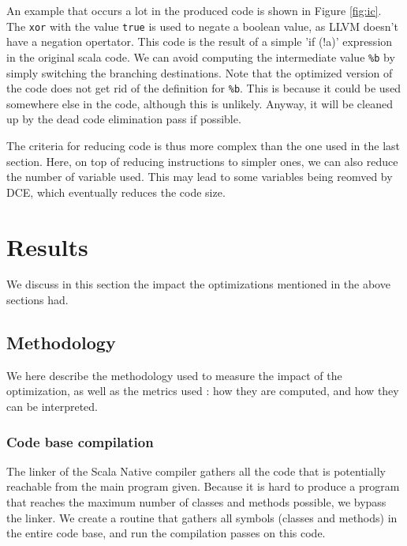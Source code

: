 \documentclass[12pt,a4paper]{article}
\newcommand{\scala}[1]{\textsf{#1}}
\newcommand{\nir}[1]{\texttt{#1}}
\begin{document}
An example that occurs a lot in the produced code is shown in Figure \ref{fig:ic}. The \nir{xor} with the value \nir{true} is used to negate a boolean value, as LLVM doesn't have a negation opertator. This code is the result of a simple '\scala{if (!a)}' expression in the original scala code. We can avoid computing the intermediate value \nir{\%b} by simply switching the branching destinations. Note that the optimized version of the code does not get rid of the definition for \nir{\%b}. This is because it could be used somewhere else in the code, although this is unlikely. Anyway, it will be cleaned up by the dead code elimination pass if possible.

The criteria for reducing code is thus more complex than the one used in the last section. Here, on top of reducing instructions to simpler ones, we can also reduce the number of variable used. This may lead to some variables being reomved by DCE, which eventually reduces the code size. 




\section{Results}

\label{resultssection}

We discuss in this section the impact the optimizations mentioned in the above sections had.

\subsection{Methodology}

We here describe the methodology used to measure the impact of the optimization, as well as the metrics used : how they are computed, and how they can be interpreted.

\subsubsection{Code base compilation}

\label{codebase}

The linker of the Scala Native compiler gathers all the code that is potentially reachable from the main program given. Because it is hard to produce a program that reaches the maximum number of classes and methods possible, we bypass the linker. We create a routine that gathers all symbols (classes and methods) in the entire code base, and run the compilation passes on this code.
\end{document}
